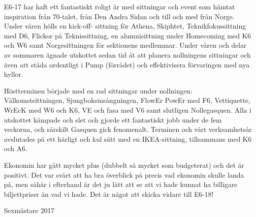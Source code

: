\documentclass[../_main/handlingar.tex]{subfiles}
\begin{document}
E6-17 har haft ett fantastiskt roligt år med sittningar och event som hämtat inspiration från 70-talet, från Den Andra Sidan och till och med från Norge. Under våren hölls en kick-off- sittning för Athena, Skiphtet, Teknikfokussittning med D6, Flickor på Teknissittning, en alumnisittning under Homecoming med K6 och W6 samt Norgesittningen för sektionens medlemmar. Under våren och delar av sommaren ägnade utskottet sedan tid åt att planera nollningens sittningar och även att städa ordentligt i Pump (förrådet) och effektivisera förvaringen med nya hyllor.

Höstterminen började med en rad sittningar under nollningen: Välkomstsittningen, Sjungboksinsångningen, FlowEr PowEr med F6, Vettiquette, WrEcK med W6 och K6, VE och fasa med V6 samt slutligen Nollegasquen. Alla i utskottet kämpade och slet och gjorde ett fantastiskt jobb under de fem veckorna, och särskilt Gasquen gick fenomenalt. Terminen och vårt verksamhetsår avslutades på ett härligt och kul sätt med en IKEA-sittning, tillsammans med K6 och A6.

Ekonomin har gått mycket plus (dubbelt så mycket som budgeterat) och det är positivt. Det var svårt att ha bra överblick på precis vad ekonomin skulle landa på, men såhär i efterhand är det ju lätt att se att vi hade kunnat ha billigare biljettpriser än vad vi hade. Det är något att skicka vidare till E6-18!
\begin{signatures}{1}
    \mvh
    \signature{Linnea Sjödahl}{Sexmästare 2017}
\end{signatures}
\end{document}
